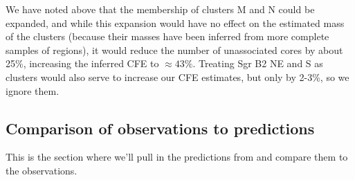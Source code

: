 \documentclass[twocolumn]{aastex61}
\begin{document}
We have noted above that the membership of clusters M and N could be expanded,
and while this expansion would have no effect on the estimated mass of the clusters
(because their masses have been inferred from more complete samples of \hii regions),
it would reduce the number of unassociated cores by about 25\%, increasing the inferred
CFE to $\approx43\%$. %
Treating Sgr B2 NE and S as clusters would also serve to increase our CFE estimates,
but only by 2-3\%, so we ignore them.

\subsection{Comparison of observations to predictions}
{\color{red} This is the section where we'll pull in the predictions from 
\citet{Kruijssen2012a} and compare them to the observations.}


\end{document}
